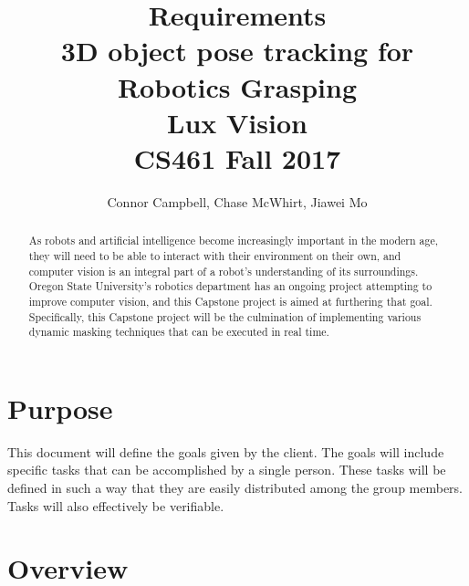 \documentclass[10pt,journal,compsoc, draftclsnofoot,onecolumn]{IEEEtran}
\title{
    Requirements
    \\3D object pose tracking for Robotics Grasping
    \\Lux Vision
    \\CS461 Fall 2017
}
\author{Connor Campbell, Chase McWhirt, Jiawei Mo}
\begin{document}
\maketitle

\begin{abstract}
As robots and artificial intelligence become increasingly important in the modern age, they will need to be able to interact with their environment on their own, and computer vision is an integral part of a robot's understanding of its surroundings.
Oregon State University's robotics department has an ongoing project attempting to improve computer vision, and this Capstone project is aimed at furthering that goal.
Specifically, this Capstone project will be the culmination of implementing various dynamic masking techniques that can be executed in real time.
\end{abstract}
\pagebreak


\tableofcontents
\pagebreak


\section{Purpose}
This document will define the goals given by the client.
The goals will include specific tasks that can be accomplished by a single person.
These tasks will be defined in such a way that they are easily distributed among the group members.
Tasks will also effectively be verifiable.




\section{Overview}
\end{document}
